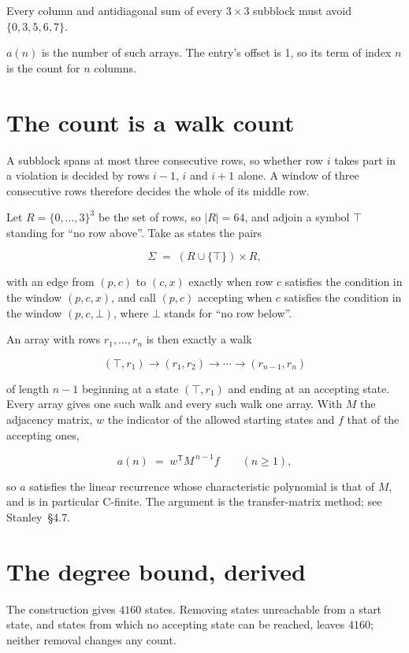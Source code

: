 \documentclass[11pt]{article}
\theoremstyle{definition}
\begin{document}
Every column and antidiagonal sum of every $3\times3$ subblock must avoid $\{0, 3, 5, 6, 7\}$.

$a(n)$ is the number of such arrays. The entry's offset is 1, so its term of index $n$ is the count for $n$ columns.

\section{The count is a walk count}

A subblock spans at most three consecutive rows, so whether row $i$ takes part in a violation is decided by rows $i-1$, $i$ and $i+1$ alone. A window of three consecutive rows therefore decides the whole of its middle row.

Let $R = \{0,\dots,3\}^{3}$ be the set of rows, so $|R| = 64$, and adjoin a symbol $\top$ standing for ``no row above''. Take as states the pairs

\[\Sigma \;=\; (R \cup \{\top\}) \times R,\]

with an edge from $(p,c)$ to $(c,x)$ exactly when row $c$ satisfies the condition in the window $(p,c,x)$, and call $(p,c)$ accepting when $c$ satisfies the condition in the window $(p,c,\bot)$, where $\bot$ stands for ``no row below''.

An array with rows $r_1,\dots,r_n$ is then exactly a walk

\[(\top,r_1) \to (r_1,r_2) \to \cdots \to (r_{n-1},r_n)\]

of length $n-1$ beginning at a state $(\top,r_1)$ and ending at an accepting state. Every array gives one such walk and every such walk one array. With $M$ the adjacency matrix, $w$ the indicator of the allowed starting states and $f$ that of the accepting ones,

\[a(n) \;=\; w^{\mathsf T} M^{\,n-1} f \qquad (n \ge 1),\]

so $a$ satisfies the linear recurrence whose characteristic polynomial is that of $M$, and is in particular C-finite. The argument is the transfer-matrix method; see Stanley~\S4.7.

\section{The degree bound, derived}

The construction gives $4160$ states. Removing states unreachable from a start state, and states from which no accepting state can be reached, leaves $4160$; neither removal changes any count.
\end{document}
